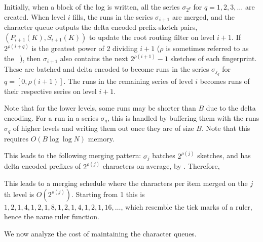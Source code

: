 Initially, when a block of the log is written, all the series $\sigma_{2^q}$
for $q=1,2,3,\ldots$ are created. When level $i$ fills, the runs in the series
$\sigma_{i+1}$ are merged, and the character queue outputs the delta encoded
prefix-sketch pairs, $(P_{i+1}(K),S_{i+1}(K))$ to update the root routing
filter on level $i+1$. If $2^{\rho(i+q)}$ is the greatest power of 2 dividing
$i+1$ ($\rho$ is sometimes referred to as the ~\cite{wiki:Thomae's_function}), then $\sigma_{i+1}$ also contains the
next $2^{\rho(i+1)}-1$ sketches of each fingerprint. These are batched and
delta encoded to become runs in the series $\sigma_{j_q}$ for $q =
[0,\rho(i+1)]$. The runs in the remaining series of level $i$ becomes runs of
their respective series on level $i+1$.

Note that for the lower levels, some runs may be shorter than $B$ due to the
delta encoding. For a run in a series $\sigma_q$, this is handled by buffering
them with the runs $\sigma_q$ of higher levels and writing them out once they
are of size $B$. Note that this requires $O(B\log\log N)$ memory.

This leads to the following merging pattern: $\sigma_j$ batches $2^{\rho(j)}$
sketches, and has delta encoded prefixes of $2^{\rho(j)}$ characters on average,
by . Therefore,


This leads to a merging schedule where the characters per item merged on the
$j$th level is $O(2^{\rho(j)})$. Starting from 1 this is
$1,2,1,4,1,2,1,8,1,2,1,4,1,2,1,16,\ldots$, which resemble the tick marks of a
ruler, hence the name ruler function.

We now analyze the cost of maintaining the character queues.


